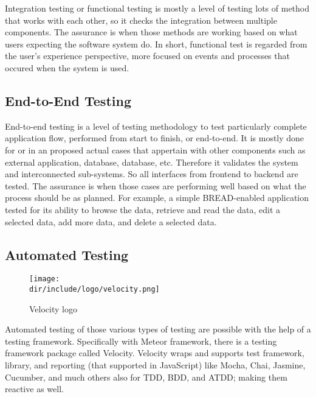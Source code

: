 Integration testing or functional testing is mostly a level of testing lots of method that works with each other, so it checks the integration between multiple components.
The assurance is when those methods are working based on what users expecting the software system do.
In short, functional test is regarded from the user's experience perspective, more focused on events and processes that occured when the system is used.

\subsection{End-to-End Testing}

End-to-end testing is a level of testing methodology to test particularly complete application flow, performed from start to finish, or end-to-end.
It is mostly done for or in an proposed actual cases that appertain with other components such as external application, database, database, etc.
Therefore it validates the system and interconnected sub-systems.
So all interfaces from frontend to backend are tested.
The assurance is when those cases are performing well based on what the process should be as planned.
For example, a simple \ac{BREAD}-enabled application tested for its ability to browse the data, retrieve and read the data, edit a selected data, add more data, and delete a selected data.

\subsection{Automated Testing}

\begin{wrapfigure}{r}{0.5\textwidth}
  \vspace{-20pt}
  \begin{center}
    \texttt{[image: \\dir/include/logo/velocity.png]}
  \end{center}
  \vspace{-20pt}
  \caption{Velocity logo}
  \label{fig:velocity-logo}
  \vspace{-10pt}
\end{wrapfigure}

Automated testing of those various types of testing are possible with the help of a testing framework.
Specifically with Meteor framework, there is a testing framework package called Velocity.
Velocity wraps and supports test framework, library, and reporting (that supported in JavaScript) like Mocha, Chai, Jasmine, Cucumber, and much others also for \ac{TDD}, \ac{BDD}, and \ac{ATDD}; making them reactive as well.

